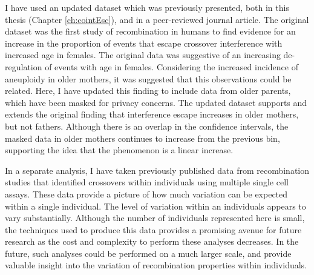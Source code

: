 I have used an updated dataset which was previously presented, both in this thesis (Chapter \ref{ch:cointEsc}), and in a peer-reviewed journal article\cite{Campbell2015}.
The original dataset was the first study of recombination in humans to find evidence for an increase in the proportion of events that escape crossover interference with increased age in females.
The original data was suggestive of an increasing de-regulation of events with age in females.
Considering the increased incidence of aneuploidy in older mothers\cite{Hassold2001}, it was suggested that this observations could be related.
Here, I have updated this finding to include data from older parents, which have been masked for privacy concerns.
The updated dataset supports and extends the original finding that interference escape increases in older mothers, but not fathers.
Although there is an overlap in the confidence intervals, the masked data in older mothers continues to increase from the previous bin, supporting the idea that the phenomenon is a linear increase.

In a separate analysis, I have taken previously published data from recombination studies that identified crossovers within individuals using multiple single cell assays.
These data provide a picture of how much variation can be expected within a single individual.
The level of variation within an individuals appears to vary substantially.
Although the number of individuals represented here is small, the techniques used to produce this data provides a promising avenue for future research as the cost and complexity to perform these analyses decreases.
In the future, such analyses could be performed on a much larger scale, and provide valuable insight into the variation of recombination properties within individuals.

\clearpage
\renewcommand{\bibname}{References}
\begingroup
    \setlength{\bibsep}{10pt}
    \linespread{1}\selectfont
    
\endgroup



